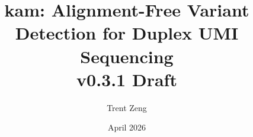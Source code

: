 \documentclass[11pt, onecolumn]{article}
\title{kam: Alignment-Free Variant Detection for Duplex UMI Sequencing\\
\large v0.3.1 Draft}
\author{Trent Zeng}
\date{April 2026}
\begin{document}
\maketitle

\begin{abstract}

\end{abstract}

\tableofcontents
\newpage










\printbibliography

\appendix

\end{document}
